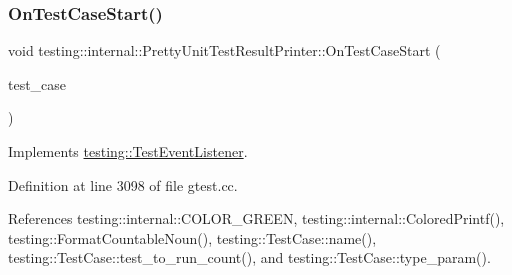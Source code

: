 \mbox{\label{classtesting_1_1internal_1_1PrettyUnitTestResultPrinter_adcb68c729565d4bcdf8418a52902c3de}} 
\subsubsection{\texorpdfstring{On\+Test\+Case\+Start()}{OnTestCaseStart()}}
{\footnotesize\ttfamily void testing\+::internal\+::\+Pretty\+Unit\+Test\+Result\+Printer\+::\+On\+Test\+Case\+Start (\begin{DoxyParamCaption}\item[{const \hyperlink{classtesting_1_1TestCase}{Test\+Case} \&}]{test\+\_\+case }\end{DoxyParamCaption})\hspace{0.3cm}{\ttfamily [virtual]}}



Implements \hyperlink{classtesting_1_1TestEventListener_ab4ed885d63f5bbff8076c1329b3dfe36}{testing\+::\+Test\+Event\+Listener}.



Definition at line 3098 of file gtest.\+cc.



References testing\+::internal\+::\+C\+O\+L\+O\+R\+\_\+\+G\+R\+E\+EN, testing\+::internal\+::\+Colored\+Printf(), testing\+::\+Format\+Countable\+Noun(), testing\+::\+Test\+Case\+::name(), testing\+::\+Test\+Case\+::test\+\_\+to\+\_\+run\+\_\+count(), and testing\+::\+Test\+Case\+::type\+\_\+param().


